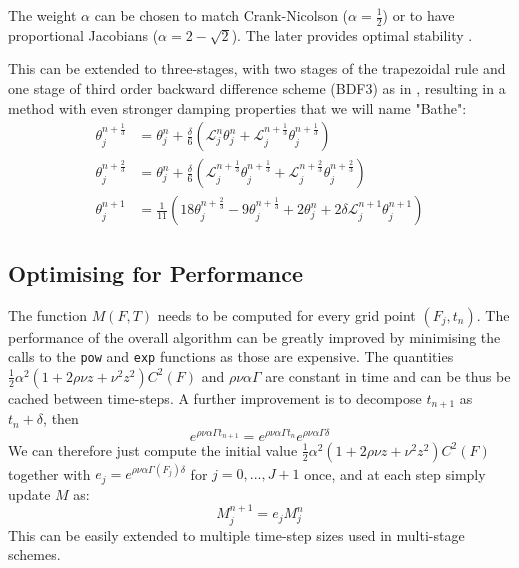 \documentclass[]{rAMF2e}
\begin{document}
The weight $\alpha$ can be chosen to match Crank-Nicolson ($\alpha=\frac{1}{2}$) or to have proportional Jacobians ($\alpha = 2-\sqrt{2}$). The later provides optimal stability \citep{dharmaraja2009optimal}. 

This can be extended to three-stages, with two stages of the trapezoidal rule and one stage of third order backward difference scheme (BDF3) as in \citep{bathe2005composite}, resulting in a method with even stronger damping properties that we will name "Bathe":
\begin{subequations}
\begin{align}
\theta_j^{n+\frac{1}{3}} &= \theta_j^n + \frac{\delta}{6}\left(\mathcal{L}_j^{n} \theta_j^n+\mathcal{L}_j^{n+\frac{1}{3}} \theta_j^{n+\frac{1}{3}}\right)\\
\theta_j^{n+\frac{2}{3}} &= \theta_j^n + \frac{\delta}{6}\left( \mathcal{L}_j^{n+\frac{1}{3}} \theta_j^{n+\frac{1}{3}}+\mathcal{L}_j^{n+\frac{2}{3}} \theta_j^{n+\frac{2}{3}}\right)\\
\theta_j^{n+1} &= \frac{1}{11}\left( 18  \theta_j^{n+\frac{2}{3}} - 9 \theta_j^{n+\frac{1}{3}} + 2 \theta_j^n + 2\delta\mathcal{L}_j^{n+1} \theta_j^{n+1}\right)
\end{align}
\end{subequations}

\subsection{Optimising for Performance}
The function $M(F,T)$ needs to be computed for every grid point $\left(F_j, t_n\right)$. The performance of the overall algorithm can be greatly improved by minimising the calls to the \texttt{pow} and \texttt{exp} functions as those are expensive. The quantities $\frac{1}{2} \alpha^2 (1+2\rho\nu z+ \nu^2 z^2) C^2(F)$ and $\rho\nu\alpha\Gamma$ are constant in time and can be thus be cached between time-steps. A further improvement is to decompose $t_{n+1}$ as $t_{n}+\delta$, then 
\begin{equation}
e^{\rho\nu\alpha\Gamma t_{n+1}}=e^{\rho\nu\alpha\Gamma t_n}e^{\rho\nu\alpha\Gamma \delta}
\end{equation}
We can therefore just compute the initial value $\frac{1}{2} \alpha^2 (1+2\rho\nu z+ \nu^2 z^2) C^2(F)$ together with $e_j = e^{\rho\nu\alpha\Gamma(F_j) \delta}$ for $j=0,...,J+1$ once, and at each step simply update $M$ as:
\begin{equation}
M_j^{n+1} = e_j M_j^{n} 
\end{equation}
This can be easily extended to multiple time-step sizes used in multi-stage schemes.
\end{document}
